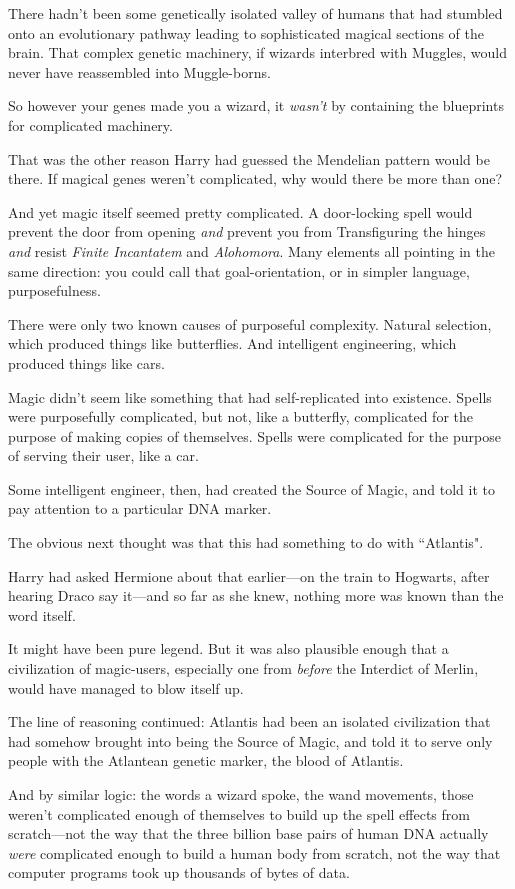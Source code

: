 There hadn't been some genetically isolated valley of humans that had stumbled onto an evolutionary pathway leading to sophisticated magical sections of the brain. That complex genetic machinery, if wizards interbred with Muggles, would never have reassembled into Muggle-borns.

So however your genes made you a wizard, it \emph{wasn't} by containing the blueprints for complicated machinery.

That was the other reason Harry had guessed the Mendelian pattern would be there. If magical genes weren't complicated, why would there be more than one?

And yet magic itself seemed pretty complicated. A door-locking spell would prevent the door from opening \emph{and} prevent you from Transfiguring the hinges \emph{and} resist \emph{Finite Incantatem} and \emph{Alohomora}. Many elements all pointing in the same direction: you could call that goal-orientation, or in simpler language, purposefulness.

There were only two known causes of purposeful complexity. Natural selection, which produced things like butterflies. And intelligent engineering, which produced things like cars.

Magic didn't seem like something that had self-replicated into existence. Spells were purposefully complicated, but not, like a butterfly, complicated for the purpose of making copies of themselves. Spells were complicated for the purpose of serving their user, like a car.

Some intelligent engineer, then, had created the Source of Magic, and told it to pay attention to a particular DNA marker.

The obvious next thought was that this had something to do with ``Atlantis".

Harry had asked Hermione about that earlier—on the train to Hogwarts, after hearing Draco say it—and so far as she knew, nothing more was known than the word itself.

It might have been pure legend. But it was also plausible enough that a civilization of magic-users, especially one from \emph{before} the Interdict of Merlin, would have managed to blow itself up.

The line of reasoning continued: Atlantis had been an isolated civilization that had somehow brought into being the Source of Magic, and told it to serve only people with the Atlantean genetic marker, the blood of Atlantis.

And by similar logic: the words a wizard spoke, the wand movements, those weren't complicated enough of themselves to build up the spell effects from scratch—not the way that the three billion base pairs of human DNA actually \emph{were} complicated enough to build a human body from scratch, not the way that computer programs took up thousands of bytes of data.

